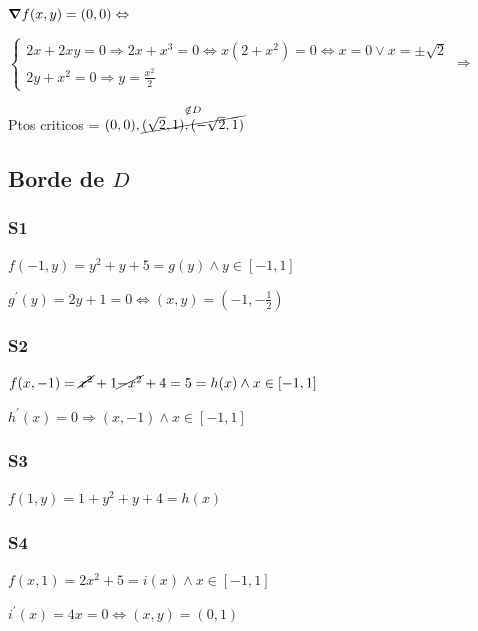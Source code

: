 \documentclass[../practica_06.tex]{subfiles}
\begin{document}
\begin{enumerate}
            $\grad f(x,y) = (0,0) \Leftrightarrow$

            $\left\{\begin{array}{ll}
                2x + 2xy = 0 \Rightarrow 2x + x^3 = 0 \Leftrightarrow x(2+x^2) = 0 \Leftrightarrow x = 0 \vee x = \pm \sqrt{2}\\
                2y + x^2 = 0 \Rightarrow y = \frac{x^2}{2}
            \end{array}
            \right. \Rightarrow$

            Ptos criticos = $ (0, 0), \stackrel{\notin D}{\cancel{(\sqrt{2},1), (-\sqrt{2},1)}}$

            \subsection*{Borde de $D$}

            \subsubsection*{S1}

            $f(-1,y) = y^2 + y + 5 = g(y) \wedge y \in [-1,1]$

            $g^{\prime}(y) = 2y + 1 = 0 \Leftrightarrow (x,y) = (-1,-\frac{1}{2})$

            \subsubsection*{S2}

            $f(x,-1) = \cancel{x^2} + 1 \cancel{- x^2} + 4 = 5 = h(x) \wedge x \in [-1,1]$

            $h^{\prime}(x) = 0 \Rightarrow (x,-1) \wedge x \in [-1,1] $

            \subsubsection{S3}

            $f(1,y) = 1 + y^2 + y + 4 = h(x)$

            \subsubsection*{S4}

            $f(x,1) = 2x^2 + 5 = i(x) \wedge x \in [-1,1]$

            $i^{\prime}(x) = 4x = 0 \Leftrightarrow (x,y) = (0,1)$



\end{enumerate}
\end{document}
